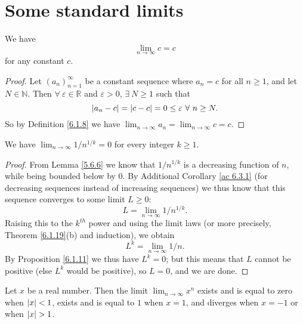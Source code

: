 \section{Some standard limits}\label{sec 6.5}

\begin{additional corollary}\label{ac 6.5.1}
We have
\[
    \lim_{n \to \infty} c = c
\]
for any constant \(c\).
\end{additional corollary}

\begin{proof}
Let \((a_n)_{n = 1}^\infty\) be a constant sequence where \(a_n = c\) for all \(n \geq 1\), and let \(N \in \mathds{N}\).
Then \(\forall\ \varepsilon \in \mathds{R}\) and \(\varepsilon > 0\), \(\exists\ N \geq 1\) such that
\[
    \abs*{a_n - c} = \abs*{c - c} = 0 \leq \varepsilon \ \forall \ n \geq N.
\]
So by Definition \ref{6.1.8} we have \(\lim_{n \to \infty} a_n = \lim_{n \to \infty} c = c\).
\end{proof}

\begin{corollary}\label{6.5.1}
We have \(\lim_{n \to \infty} 1 / n^{1 / k} = 0\) for every integer \(k \geq 1\).
\end{corollary}

\begin{proof}
From Lemma \ref{5.6.6} we know that \(1 / n^{1 / k}\) is a decreasing function of \(n\), while being bounded below by \(0\).
By Additional Corollary \ref{ac 6.3.1} (for decreasing sequences instead of increasing sequences) we thus know that this sequence converges to some limit \(L \geq 0\):
\[
    L = \lim_{n \to \infty} 1 / n^{1 / k}.
\]
Raising this to the \(k^{th}\) power and using the limit laws (or more precisely, Theorem \ref{6.1.19}(b) and induction), we obtain
\[
    L^k = \lim_{n \to \infty} 1 / n.
\]
By Proposition \ref{6.1.11} we thus have \(L^k = 0\);
but this means that \(L\) cannot be positive (else \(L^k\) would be positive), so \(L = 0\), and we are done.
\end{proof}

\begin{lemma}\label{6.5.2}
Let \(x\) be a real number.
Then the limit \(\lim_{n \to \infty} x^n\) exists and is equal to zero when \(\abs*{x} < 1\), exists and is equal to \(1\) when \(x = 1\), and diverges when \(x = -1\) or when \(\abs*{x} > 1\).
\end{lemma}

